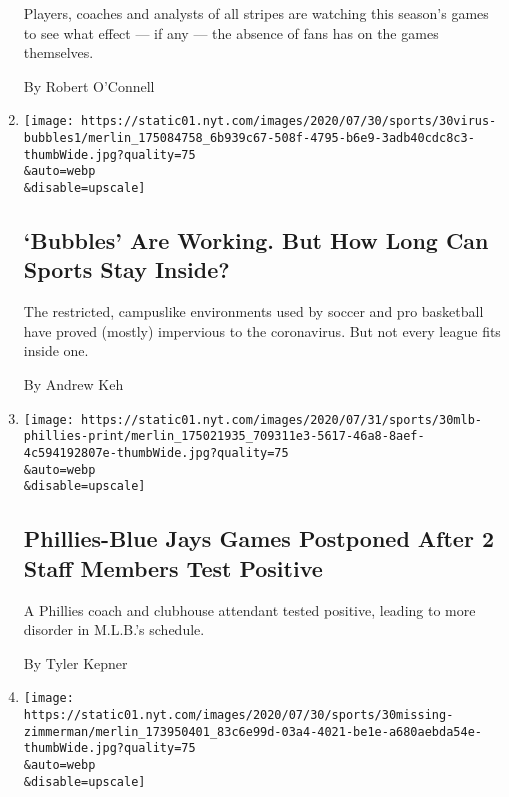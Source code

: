 \begin{enumerate}
  Players, coaches and analysts of all stripes are watching this
  season's games to see what effect --- if any --- the absence of fans
  has on the games themselves.

  By Robert O'Connell
\item
  \href{/2020/07/30/sports/basketball/sports-bubble-nba-mlb.html}{}

  \texttt{[image: https://static01.nyt.com/images/2020/07/30/sports/30virus-bubbles1/merlin\_175084758\_6b939c67-508f-4795-b6e9-3adb40cdc8c3-thumbWide.jpg?quality=75\\\&auto=webp\\\&disable=upscale]}

  \hypertarget{bubbles-are-working-but-how-long-can-sports-stay-inside}{%
  \subsection{`Bubbles' Are Working. But How Long Can Sports Stay
  Inside?}\label{bubbles-are-working-but-how-long-can-sports-stay-inside}}

  The restricted, campuslike environments used by soccer and pro
  basketball have proved (mostly) impervious to the coronavirus. But not
  every league fits inside one.

  By Andrew Keh
\item
  \href{/2020/07/30/sports/baseball/phillies-blue-jays-postponed-coronavirus.html}{}

  \texttt{[image: https://static01.nyt.com/images/2020/07/31/sports/30mlb-phillies-print/merlin\_175021935\_709311e3-5617-46a8-8aef-4c594192807e-thumbWide.jpg?quality=75\\\&auto=webp\\\&disable=upscale]}

  \hypertarget{phillies-blue-jays-games-postponed-after-2-staff-members-test-positive}{%
  \subsection{Phillies-Blue Jays Games Postponed After 2 Staff Members
  Test
  Positive}\label{phillies-blue-jays-games-postponed-after-2-staff-members-test-positive}}

  A Phillies coach and clubhouse attendant tested positive, leading to
  more disorder in M.L.B.'s schedule.

  By Tyler Kepner
\item
  \href{/2020/07/30/sports/players-opt-out.html}{}

  \texttt{[image: https://static01.nyt.com/images/2020/07/30/sports/30missing-zimmerman/merlin\_173950401\_83c6e99d-03a4-4021-be1e-a680aebda54e-thumbWide.jpg?quality=75\\\&auto=webp\\\&disable=upscale]}


\end{enumerate}
